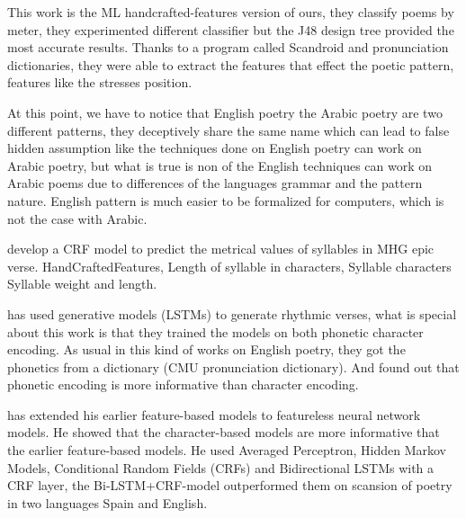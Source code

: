 \cite{Tanasescu2016AutomaticClassificationOfPoetryMeterRhyme} This work is the ML
handcrafted-features version of ours, they classify poems by meter, they experimented different
classifier but the J48 design tree provided the most accurate results. Thanks to a program called
Scandroid and pronunciation dictionaries, they were able to extract the features that effect the
poetic pattern, features like the stresses position.

At this point, we have to notice that English poetry the Arabic poetry are two different patterns,
they deceptively share the same name which can lead to false hidden assumption like the techniques
done on English poetry can work on Arabic poetry, but what is true is non of the English techniques
can work on Arabic poems due to differences of the languages grammar and the pattern nature. English
pattern is much easier to be formalized for computers, which is not the case with Arabic.

\cite{Estes2016SupervisedMachineLearningForHybridMeter} develop a CRF model to predict the metrical
values of syllables in MHG epic verse. HandCraftedFeatures, Length of syllable in characters,
Syllable characters Syllable weight and length.



\cite{Hopkins2017AutomaticallyGeneratingRhythmic} has used generative models (LSTMs) to generate
rhythmic verses, what is special about this work is that they trained the models on both phonetic
character encoding. As usual in this kind of works on English poetry, they got the phonetics from a
dictionary (CMU pronunciation dictionary).  And found out that phonetic encoding is more informative
than character encoding.

\cite{Agirrezabal2017ComparisonFeatureBasedNeural} has extended his earlier feature-based models to
featureless neural network models. He showed that the character-based models are more informative
that the earlier feature-based models. He used Averaged Perceptron, Hidden Markov Models,
Conditional Random Fields (CRFs) and Bidirectional LSTMs with a CRF layer, the Bi-LSTM+CRF-model
outperformed them on scansion of poetry in two languages Spain and English.



